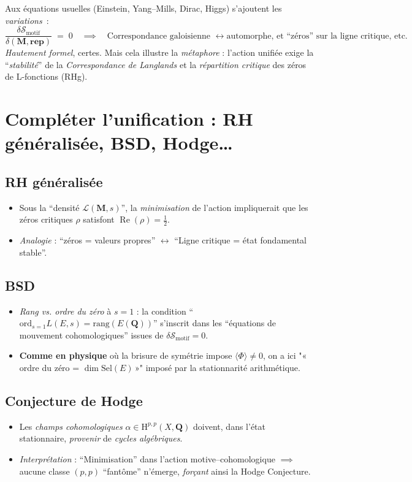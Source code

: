 \documentclass[11pt]{article}
\begin{document}
Aux équations usuelles (Einstein, Yang--Mills, Dirac, Higgs) s'ajoutent les \emph{variations}~:
\[
  \frac{\delta \mathcal{S}_{\mathrm{motif}}}{\delta (\mathbf{M}, \mathbf{rep})} 
  \;=\;
  0
  \quad \implies
  \quad
  \text{Correspondance galoisienne }\leftrightarrow \text{automorphe, et “zéros” sur la ligne critique, etc.}
\]
\noindent
\emph{Hautement formel}, certes. Mais cela illustre la \emph{métaphore} : l'action unifiée exige la “\emph{stabilité}” de la \emph{Correspondance de Langlands} et la \emph{répartition critique} des zéros de L-fonctions (RHg).

\section{Compléter l’unification : RH généralisée, BSD, Hodge\dots}
\label{sec:completer_unification}

\subsection{RH généralisée}
\begin{itemize}
  \item Sous la “densité \(\mathcal{L}(\mathbf{M},s)\)”, la \emph{minimisation} de l'action impliquerait que les zéros critiques \(\rho\) satisfont \(\operatorname{Re}(\rho)=\tfrac12\).
  \item \emph{Analogie} : “zéros = valeurs propres” $\leftrightarrow$ “Ligne critique = état fondamental stable”. 
\end{itemize}

\subsection{BSD}
\begin{itemize}
  \item \emph{Rang vs. ordre du zéro} à $s=1$ : la condition “\(\mathrm{ord}_{s=1} L(E,s) = \mathrm{rang}(E(\mathbf{Q}))\)” s'inscrit dans les “équations de mouvement cohomologiques” issues de \(\delta \mathcal{S}_{\mathrm{motif}}=0\). 
  \item \textbf{Comme en physique} où la brisure de symétrie impose 
\(\langle \Phi \rangle \neq 0\), on a ici 
"«\,ordre du zéro = $\dim \mathrm{Sel}(E)$\,»"
imposé par la stationnarité arithmétique.
\end{itemize}

\subsection{Conjecture de Hodge}
\begin{itemize}
  \item Les \emph{champs cohomologiques} \(\alpha\in \mathrm{H}^{p,p}(X,\mathbf{Q})\) doivent, dans l'état stationnaire, \emph{provenir} de \emph{cycles algébriques}. 
  \item \emph{Interprétation} : “Minimisation” dans l'action motive--cohomologique $\implies$ aucune classe \((p,p)\) “fantôme” n'émerge, \emph{forçant} ainsi la Hodge Conjecture.
\end{itemize}
\end{document}
